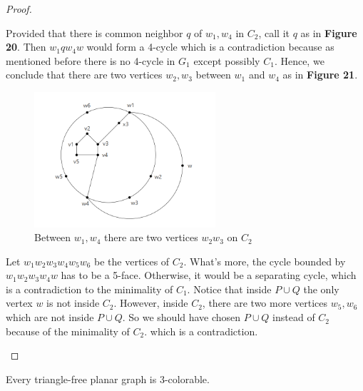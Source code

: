 \begin{proof}
\begin{itemize}
Provided that there is common neighbor $q$ of $w_1, w_4$ in $C_2$, call it $q$ as in \textbf{Figure 20}. Then $w_1qw_4w$ would form a 4-cycle which is a contradiction because as mentioned before there is no 4-cycle in $G_1$ except possibly $C_1$. Hence, we conclude that there are two vertices $w_2, w_3$ between $w_1$ and $w_4$ as in \textbf{Figure 21}. 
\begin{figure}[H] %
    \centering %
    \includegraphics[width=0.6\textwidth]{figure/contradictionlemma2.2.2.png} 
    \caption{Between $w_1, w_4$ there are two vertices $w_2w_3$ on $C_2$ } %
    \label{figure} %
\end{figure}
Let $w_1w_2w_3w_4w_5w_6$ be the vertices of $C_2$. What's more, the cycle bounded by $w_1w_2w_3w_4w$ has to be a 5-face. Otherwise, it would be a separating cycle, which is a contradiction to the minimality of $C_1$. Notice that inside $P \cup Q$ the only vertex $w$ is not inside $C_2$. However, inside $C_2$, there are two more vertices $w_5, w_6$ which are not inside $P \cup Q$. So we should have chosen $P \cup Q$ instead of $C_2$ because of the minimality of $C_2$. which is a contradiction.
\end{itemize}
\end{proof}
\begin{theorem}
Every triangle-free planar graph is 3-colorable. \cite{grotzsch1959dreifarbensatz}
\end{theorem}

